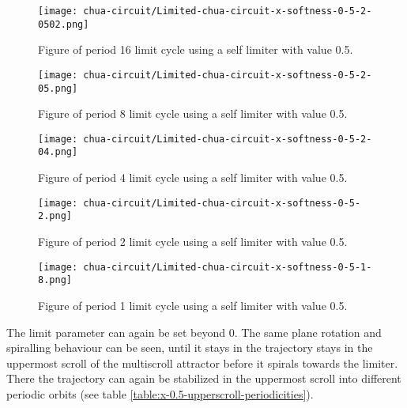 \documentclass[main]{subfiles}
\begin{document}
\begin{figure}[H]
\centering
\texttt{[image: chua-circuit/Limited-chua-circuit-x-softness-0-5-2-0502.png]}
\caption[Figure of period 16 limit cycle]{Figure of period 16 limit cycle using a self limiter with value 0.5.}
\label{figure:x-0.5-16-limit-cycle-trajectory}
\end{figure}

\begin{figure}[H]
\centering
\texttt{[image: chua-circuit/Limited-chua-circuit-x-softness-0-5-2-05.png]}
\caption[Figure of period 8 limit cycle]{Figure of period 8 limit cycle using a self limiter with value 0.5.}
\label{figure:x-0.5-8-limit-cycle-trajectory}
\end{figure}

\begin{figure}[H]
\centering
\texttt{[image: chua-circuit/Limited-chua-circuit-x-softness-0-5-2-04.png]}
\caption[Figure of period 4 limit cycle]{Figure of period 4 limit cycle using a self limiter with value 0.5.}
\label{figure:x-0.5-4-limit-cycle-trajectory}
\end{figure}

\begin{figure}[H]
\centering
\texttt{[image: chua-circuit/Limited-chua-circuit-x-softness-0-5-2.png]}
\caption[Figure of period 2 limit cycle]{Figure of period 2 limit cycle using a self limiter with value 0.5.}
\label{figure:x-0.5-2-limit-cycle-trajectory}
\end{figure}

\begin{figure}[H]
\centering
\texttt{[image: chua-circuit/Limited-chua-circuit-x-softness-0-5-1-8.png]}
\caption[Figure of period 1 limit cycle]{Figure of period 1 limit cycle using a self limiter with value 0.5.}
\label{figure:x-0.5-1-limit-cycle-trajectory}
\end{figure}

The limit parameter can again be set beyond 0. The same plane rotation and spiralling behaviour can be seen, until it stays in the trajectory stays in the uppermost scroll of the multiscroll attractor before it spirals towards the limiter. %
%
There the trajectory can again be stabilized in the uppermost scroll into different periodic orbits (see table \ref{table:x-0.5-upperscroll-periodicities}).
\end{document}
